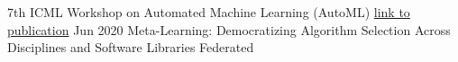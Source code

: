 \begin{cvhonors}
  \cvhonor
    {7th ICML Workshop on Automated Machine Learning (AutoML)}
    {\empty}
    {\href{https://www.automl.org/wp-content/uploads/2020/07/AutoML_2020_paper_39.pdf}{link to publication}}
    {Jun 2020}
  \cvhon
    {}
    {Meta-Learning: Democratizing Algorithm Selection Across Disciplines and Software Libraries}
    {}
    {Federated}
\end{cvhonors}


